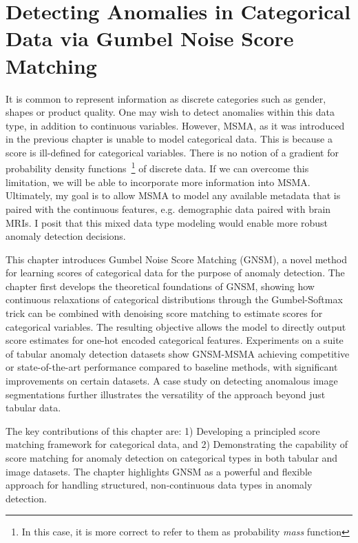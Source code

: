 \chapter{Detecting Anomalies in Categorical Data via Gumbel Noise Score Matching}
\label{ch:gnsm}

It is common to represent information as discrete categories such as gender, shapes or product quality.
One may wish to detect anomalies within this data type, in addition to continuous variables. However, MSMA, as it was introduced in the previous chapter is unable to model categorical data.
This is because a score is ill-defined for categorical variables. There is no notion of a gradient for probability density functions~\footnote{In this case, it is more correct to refer to them as probability \textit{mass} function} of discrete data. If we can overcome this limitation, we will be able to incorporate more information into MSMA. Ultimately, my goal is to allow MSMA to model any available metadata that is paired with the continuous features, e.g. demographic data paired with brain MRIs. I posit that this mixed data type modeling would enable more robust anomaly detection decisions.

This chapter introduces Gumbel Noise Score Matching (GNSM), a novel method for learning scores of categorical data for the purpose of anomaly detection.
The chapter first develops the theoretical foundations of GNSM, showing how continuous relaxations of categorical distributions through the Gumbel-Softmax trick can be combined with denoising score matching to estimate scores for categorical variables. The resulting objective allows the model to directly output score estimates for one-hot encoded categorical features. Experiments on a suite of tabular anomaly detection datasets show GNSM-MSMA achieving competitive or state-of-the-art performance compared to baseline methods, with significant improvements on certain datasets. A case study on detecting anomalous image segmentations further illustrates the versatility of the approach beyond just tabular data.

The key contributions of this chapter are: 1) Developing a principled score matching framework for categorical data, and 2) Demonstrating the capability of score matching for anomaly detection on categorical types in both tabular and image datasets. The chapter highlights GNSM as a powerful and flexible approach for handling structured, non-continuous data types in anomaly detection.


